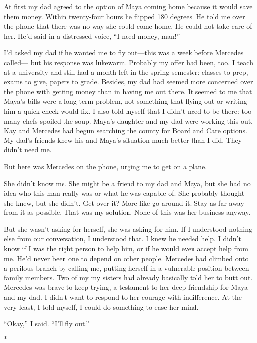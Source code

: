 \documentclass[12pt]{book}
\begin{document}
At first my dad agreed to the option of Maya coming home because it would save them money. Within twenty-four hours he flipped 180 degrees. He told me over the phone that there was no way she could come home. He could not take care of her. He'd said in a distressed voice, ``I need money, man!''

I'd asked my dad if he wanted me to fly out---this was a week before Mercedes called--- but his response was lukewarm. Probably my offer had been, too. I teach at a university and still had a month left in the spring semester: classes to prep, exams to give, papers to grade. Besides, my dad had seemed more concerned over the phone with getting money than in having me out there. It seemed to me that Maya's bills were a long-term problem, not something that flying out or writing him a quick check would fix. I also told myself that I didn't need to be there: too many chefs spoiled the soup. Maya's daughter and my dad were working this out. Kay and Mercedes had begun searching the county for Board and Care options. My dad's friends knew his and Maya's situation much better than I did. They didn't need me.

But here was Mercedes on the phone, urging me to get on a plane.

She didn't know me. She might be a friend to my dad and Maya, but she had no idea who this man really was or what he was capable of. She probably thought she knew, but she didn't. Get over it? More like go around it. Stay as far away from it as possible. That was my solution. None of this was her business anyway.

But she wasn't asking for herself, she was asking for him. If I understood nothing else from our conversation, I understood that. I knew he needed help. I didn't know if I was the right person to help him, or if he would even accept help from me. He'd never been one to depend on other people. Mercedes had climbed onto a perilous branch by calling me, putting herself in a vulnerable position between family members. Two of my my sisters had already basically told her to butt out. Mercedes was brave to keep trying, a testament to her deep friendship for Maya and my dad. I didn't want to respond to her courage with indifference. At the very least, I told myself, I could do something to ease her mind.

``Okay,'' I said. ``I'll fly out.''

\begin{center}$*$\end{center}
\end{document}
